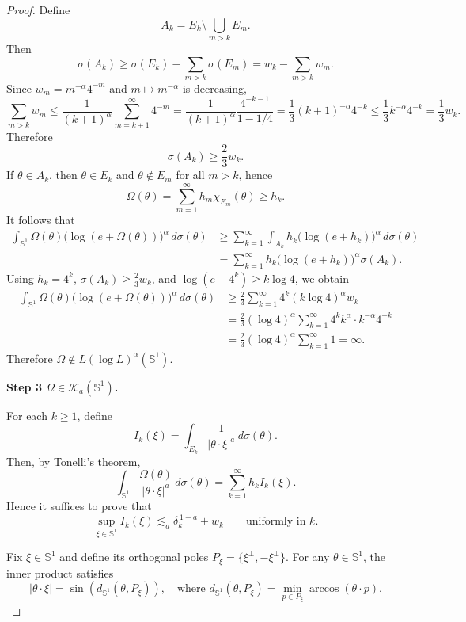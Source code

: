 \documentclass[11pt]{amsart}
\begin{document}
\begin{proof}
	Define
	\[
	A_k=E_k\setminus \bigcup_{m>k}E_m.
	\]
	Then
	\[
	\sigma(A_k)\ge \sigma(E_k)-\sum_{m>k}\sigma(E_m)
	=w_k-\sum_{m>k}w_m.
	\]
	Since $w_m=m^{-\alpha}4^{-m}$ and $m\mapsto m^{-\alpha}$ is decreasing,
	\[
	\sum_{m>k}w_m
	\le \frac{1}{(k+1)^\alpha}\sum_{m=k+1}^\infty 4^{-m}
	=\frac{1}{(k+1)^\alpha}\frac{4^{-k-1}}{1-1/4}
	=\frac{1}{3}(k+1)^{-\alpha}4^{-k}
	\le \frac{1}{3}k^{-\alpha}4^{-k}
	=\frac{1}{3}w_k.
	\]
	Therefore
	\[
	\sigma(A_k)\ge \frac{2}{3}w_k.
	\]
	If $\theta\in A_k$, then $\theta\in E_k$ and $\theta\notin E_m$ for all $m>k$, hence
	\[
	\Omega(\theta)=\sum_{m=1}^\infty h_m\chi_{E_m}(\theta)\ge h_k.
	\]
	It follows that
	\begin{align*}
		\int_{\mathbb{S}^1}\Omega(\theta)\bigl(\log(e+\Omega(\theta))\bigr)^\alpha\,d\sigma(\theta)
		&\ge \sum_{k=1}^\infty
		\int_{A_k} h_k\bigl(\log(e+h_k)\bigr)^\alpha\,d\sigma(\theta) \\
		&= \sum_{k=1}^\infty h_k\bigl(\log(e+h_k)\bigr)^\alpha \sigma(A_k).
	\end{align*}
	Using $h_k=4^k$, $\sigma(A_k)\ge \frac23 w_k$, and
	$\log(e+4^k)\ge k\log 4$, we obtain
	\begin{align*}
		\int_{\mathbb{S}^1}\Omega(\theta)\bigl(\log(e+\Omega(\theta))\bigr)^\alpha\,d\sigma(\theta)
		&\ge \frac{2}{3}\sum_{k=1}^\infty
		4^k (k\log 4)^\alpha w_k \\
		&= \frac{2}{3}(\log 4)^\alpha
		\sum_{k=1}^\infty 4^k k^\alpha \cdot k^{-\alpha}4^{-k} \\
		&= \frac{2}{3}(\log 4)^\alpha \sum_{k=1}^\infty 1
		= \infty.
	\end{align*}
	Therefore $\Omega\notin L(\log L)^\alpha(\mathbb{S}^1)$.
	
	\medskip
	\noindent\textbf{Step 3 \(\Omega\in \mathcal K_a(\mathbb{S}^1)\).}
	
	For each $k\ge 1$, define
	$$ I_k(\xi) = \int_{E_k} \frac{1}{|\theta \cdot \xi|^a} \, d\sigma(\theta). $$
	Then, by Tonelli's theorem,
	$$ \int_{\mathbb{S}^1} \frac{\Omega(\theta)}{|\theta \cdot \xi|^a} \, d\sigma(\theta) = \sum_{k=1}^\infty h_k I_k(\xi). $$
	Hence it suffices to prove that
	$$ \sup_{\xi\in\mathbb{S}^1} I_k(\xi) \lesssim_a \delta_k^{\,1-a} + w_k \qquad \text{uniformly in } k. $$
	
	Fix $\xi \in \mathbb{S}^1$ and define its orthogonal poles $P_\xi = \{\xi^\perp, -\xi^\perp\}$. For any $\theta \in \mathbb{S}^1$, the inner product satisfies
	$$ |\theta \cdot \xi| = \sin(d_{\mathbb{S}^1}(\theta, P_\xi)), \quad \text{where } d_{\mathbb{S}^1}(\theta, P_\xi) = \min_{p \in P_\xi} \arccos(\theta \cdot p). $$
	

\end{proof}
\end{document}
